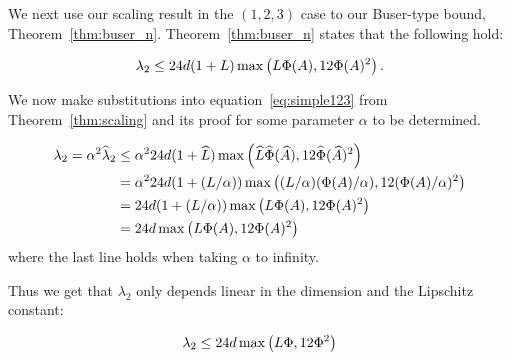 We next use our scaling result in the $(1,2,3)$ case
to our Buser-type bound, Theorem~\ref{thm:buser_n}.
Theorem~\ref{thm:buser_n} states that the following hold:

\begin{align}\label{eq:simple123}
  \lambda_2 \leq 24 d (1+L) 
  \max\left(L \Phi(A), 12 \Phi(A)^2 \vph\right).
\end{align}

We now make substitutions into equation~\ref{eq:simple123}
from Theorem~\ref{thm:scaling} and its proof for some parameter $\alpha$ to be determined.


\begin{align*}
  \lambda_2 = \alpha^2 \hat{\lambda}_2 &\leq  \alpha^2  24 d (1+\hat{L}) 
  \max\left(\hat{L} \Phihat(\Ahat), 12 \Phihat(\Ahat)^2 \vph\right) \\
  &=  \alpha^2  24 d (1+ (L/\alpha))
  \max\left((L/\alpha) (\Phi(A)/\alpha), 12 (\Phi(A)/\alpha)^2 \vph\right) \\
  &=  24 d (1+ (L/\alpha))
  \max\left(L \Phi(A), 12 \Phi(A)^2 \vph\right) \\
  &=  24 d \max\left(L \Phi(A), 12 \Phi(A)^2 \vph\right)
\end{align*}
where the last line holds when taking $\alpha$ to infinity.

Thus we get that $\lambda_2$ only depends linear in the dimension and  the Lipschitz constant:

\begin{corollary}\label{cor:strongBuser}
  \[
  \lambda_2 \leq  24 d \max\left(L \Phi, 12 \Phi^2 \vph\right)
  \]
\end{corollary}




